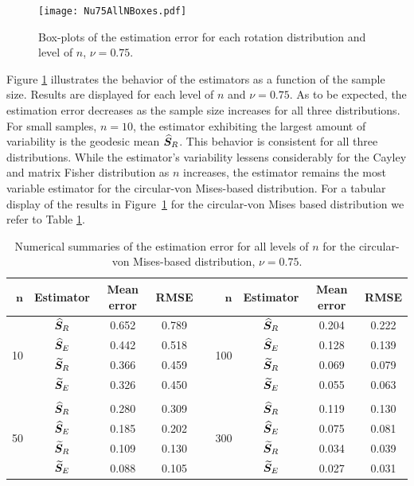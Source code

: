 \begin{figure}[h!]
\centering
\texttt{[image: Nu75AllNBoxes.pdf]}
\caption{Box-plots of the estimation error for each rotation distribution and level of $n$,  $\nu=0.75$.}
\label{fig:NBoxes}
\end{figure}

\noindent Figure \ref{fig:NBoxes} illustrates the behavior of the estimators as a function of the sample size. Results are displayed for each level of $n$ and  $\nu=0.75$. As to be expected, the estimation error decreases as the sample size increases for all three distributions. For small samples, $n=10$, the estimator exhibiting the largest amount of variability is the geodesic mean ${\widehat{\bm S}_R}$. This behavior is consistent for all three distributions.  While the estimator's variability lessens considerably for the Cayley and matrix Fisher distribution as $n$ increases, the estimator remains the most variable estimator for the circular-von Mises-based distribution.   For a tabular display of the results in Figure~\ref{fig:NBoxes} for the circular-von Mises based distribution we refer to Table \ref{tab:vmnu75}.  

\begin{center}
\begin{table}[h!]
\caption{Numerical summaries of the estimation error for all levels of $n$ for the circular-von Mises-based distribution,  $\nu=0.75$.  \label{tab:vmnu75}}
\begin{tabular}{rccccrccc}
  \hline
 $\mathbf{n}$ & \textbf{Estimator}  & \textbf{Mean error} & \textbf{RMSE} & &$\mathbf{n}$ & \textbf{Estimator} & \textbf{Mean error} & \textbf{RMSE} \\ \hline \hline
   \multirow{4}{*}{10} & ${\widehat{\bm S}_R}$  & 0.652 & 0.789 &  & \multirow{4}{*}{100} & ${\widehat{\bm S}_R}$  & 0.204 & 0.222 \\ 
    & ${\widehat{\bm S}_E}$  & 0.442 & 0.518 &   & & ${\widehat{\bm S}_E}$ & 0.128 & 0.139 \\ 
    & ${\widetilde{\bm S}_R}$  & 0.366 & 0.459 &  &  & ${\widetilde{\bm S}_R}$  & 0.069 & 0.079 \\ 
    & ${\widetilde{\bm S}_E}$  & 0.326 & 0.450 &   & & ${\widetilde{\bm S}_E}$  & 0.055 & 0.063 \\  
    & & & & & & & \\ 
    \multirow{4}{*}{50} & ${\widehat{\bm S}_R}$  & 0.280 & 0.309 &  &  \multirow{4}{*}{300} & ${\widehat{\bm S}_R}$  & 0.119 & 0.130 \\ 
    & ${\widehat{\bm S}_E}$  & 0.185 & 0.202 &  &  & ${\widehat{\bm S}_E}$  & 0.075 & 0.081 \\ 
    & ${\widetilde{\bm S}_R}$  & 0.109 & 0.130 &  & & ${\widetilde{\bm S}_R}$  & 0.034 & 0.039 \\
    & ${\widetilde{\bm S}_E}$ & 0.088 & 0.105 &  &  & ${\widetilde{\bm S}_E}$ & 0.027 & 0.031 \\ 
   \hline
\end{tabular}
\end{table}
\end{center}

